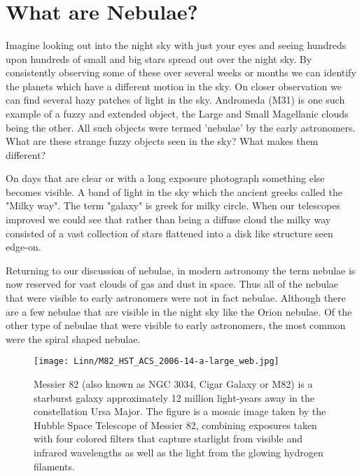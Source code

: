 \documentclass{../template/texnote}
\title{\textbf{\capitalisewords{The Galaxy Revelation and a Growing Universe}}}%
\begin{document}
    \maketitle {}


\section{What are Nebulae? }

Imagine looking out into the night sky with just your eyes and seeing hundreds upon hundreds of small and big stars spread out over the night sky. By consistently observing some of these over several weeks or months we can identify the planets which have a different motion in the sky. On closer observation we can find several hazy patches of light in the sky. Andromeda (M31) is one such example of a fuzzy and extended object, the Large and Small Magellanic clouds being the other.  All such objects were termed 'nebulae' by the early astronomers. What are these strange fuzzy objects seen in the sky? What makes them different? 

On days that are clear or with a long exposure photograph something else becomes visible. A band of light in the sky which the ancient greeks called the "Milky way". The term "galaxy" is greek for milky circle. When our telescopes improved we could see that rather than being a diffuse cloud the milky way consisted of a vast collection of stars flattened into a disk like structure seen edge-on. 

Returning to our discussion of nebulae, in modern astronomy the term nebulae is now reserved for vast clouds of gas and dust in space. Thus all of the nebulae that were visible to early astronomers were not in fact nebulae. Although there are a few nebulae that are visible in the night sky like the Orion nebulae.  Of the other type of nebulae that were visible to early astronomers, the most common were the spiral shaped nebulae. 

\begin{figure}
     \centering
     \texttt{[image: Linn/M82\_HST\_ACS\_2006-14-a-large\_web.jpg]}
     \label{fig:cigar}
     \caption{ Messier 82 (also known as NGC 3034, Cigar Galaxy or M82) is a starburst galaxy approximately 12 million light-years away in the constellation Ursa Major. The figure is a mosaic image taken by the Hubble Space Telescope of Messier 82, combining exposures taken with four colored filters that capture starlight from visible and infrared wavelengths as well as the light from the glowing hydrogen filaments. }
 \end{figure}
 
\end{document}
